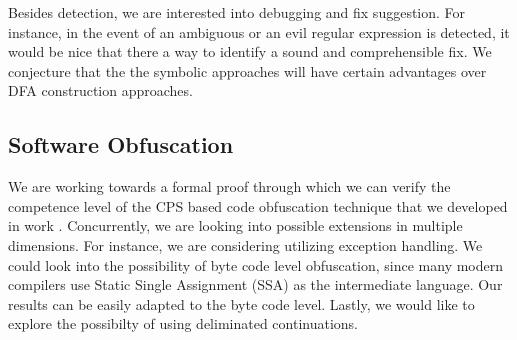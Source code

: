 \documentclass[12pt]{article}
\theoremstyle{plain} \numberwithin{equation}{section}
\theoremstyle{definition}
\newcommand{\kl}[1]{}
\begin{document}
Besides detection, we are interested into debugging and fix
suggestion. For instance, in the event of an ambiguous or an evil
regular expression is detected, it would be nice that there a way to
identify a sound and comprehensible fix. We conjecture that the 
the symbolic approaches will have certain advantages over DFA
construction approaches.


\subsection{Software Obfuscation}
We are working towards a formal proof through which we can verify the
competence level of the CPS based code obfuscation technique that we
developed in work \cite{DBLP:conf/pepm/Lu19}.  Concurrently, we are
looking into possible extensions in multiple dimensions. For instance,
we are considering utilizing exception handling. We could look into
the possibility of byte code level obfuscation, since many modern
compilers use Static Single Assignment (SSA) as the intermediate
language. Our results can be easily adapted to the byte code level.
Lastly, we would like to explore the possibilty of using deliminated
continuations. 

\kl{debugging}
\end{document}
